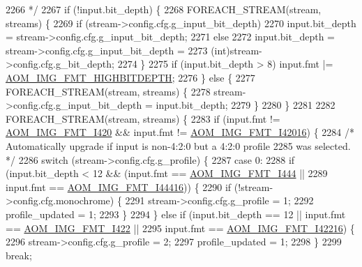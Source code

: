 \begin{DoxyCodeInclude}
{{{{{{{{{{{{{{{{{{{{{{{{{{{{{{{{{{{{{{{{{{{{{{{{{{{{2266 \textcolor{comment}{     */}
2267     \textcolor{keywordflow}{if} (!input.bit\_depth) \{
2268       FOREACH\_STREAM(stream, streams) \{
2269         \textcolor{keywordflow}{if} (stream->config.cfg.g\_input\_bit\_depth)
2270           input.bit\_depth = stream->config.cfg.g\_input\_bit\_depth;
2271         \textcolor{keywordflow}{else}
2272           input.bit\_depth = stream->config.cfg.g\_input\_bit\_depth =
2273               (int)stream->config.cfg.g\_bit\_depth;
2274       \}
2275       \textcolor{keywordflow}{if} (input.bit\_depth > 8) input.fmt |= \hyperlink{aom__image_8h_a607b37d91f75442f54223ecd85f1b6cb}{AOM\_IMG\_FMT\_HIGHBITDEPTH};
2276     \} \textcolor{keywordflow}{else} \{
2277       FOREACH\_STREAM(stream, streams) \{
2278         stream->config.cfg.g\_input\_bit\_depth = input.bit\_depth;
2279       \}
2280     \}
2281 
2282     FOREACH\_STREAM(stream, streams) \{
2283       \textcolor{keywordflow}{if} (input.fmt != \hyperlink{aom__image_8h_a930317c04b4bd0a660bb5e744055523cabd778a3d697463e89d12a1117f417b60}{AOM\_IMG\_FMT\_I420} && input.fmt != 
      \hyperlink{aom__image_8h_a930317c04b4bd0a660bb5e744055523ca20a9cf30277260685642b4cfb4e9273b}{AOM\_IMG\_FMT\_I42016}) \{
2284         \textcolor{comment}{/* Automatically upgrade if input is non-4:2:0 but a 4:2:0 profile}
2285 \textcolor{comment}{           was selected. */}
2286         \textcolor{keywordflow}{switch} (stream->config.cfg.g\_profile) \{
2287           \textcolor{keywordflow}{case} 0:
2288             \textcolor{keywordflow}{if} (input.bit\_depth < 12 && (input.fmt == \hyperlink{aom__image_8h_a930317c04b4bd0a660bb5e744055523ca89d423506e948ab7d3b98b5750b92655}{AOM\_IMG\_FMT\_I444} ||
2289                                          input.fmt == \hyperlink{aom__image_8h_a930317c04b4bd0a660bb5e744055523cab9b93d397dedbdd6bfafec84d1f8f0f5}{AOM\_IMG\_FMT\_I44416})) \{
2290               \textcolor{keywordflow}{if} (!stream->config.cfg.monochrome) \{
2291                 stream->config.cfg.g\_profile = 1;
2292                 profile\_updated = 1;
2293               \}
2294             \} \textcolor{keywordflow}{else} \textcolor{keywordflow}{if} (input.bit\_depth == 12 || input.fmt == \hyperlink{aom__image_8h_a930317c04b4bd0a660bb5e744055523cab2f75281e94ebc0f0bc728ef287cd3e8}{AOM\_IMG\_FMT\_I422} ||
2295                        input.fmt == \hyperlink{aom__image_8h_a930317c04b4bd0a660bb5e744055523ca064683ed4260fc6244af6cfc9d261c22}{AOM\_IMG\_FMT\_I42216}) \{
2296               stream->config.cfg.g\_profile = 2;
2297               profile\_updated = 1;
2298             \}
2299             \textcolor{keywordflow}{break};
}}}}}}}}}}}}}}}}}}}}}}}}}}}}}}}}}}}}}}}}}}}}}}}}}}}}
\end{DoxyCodeInclude}
